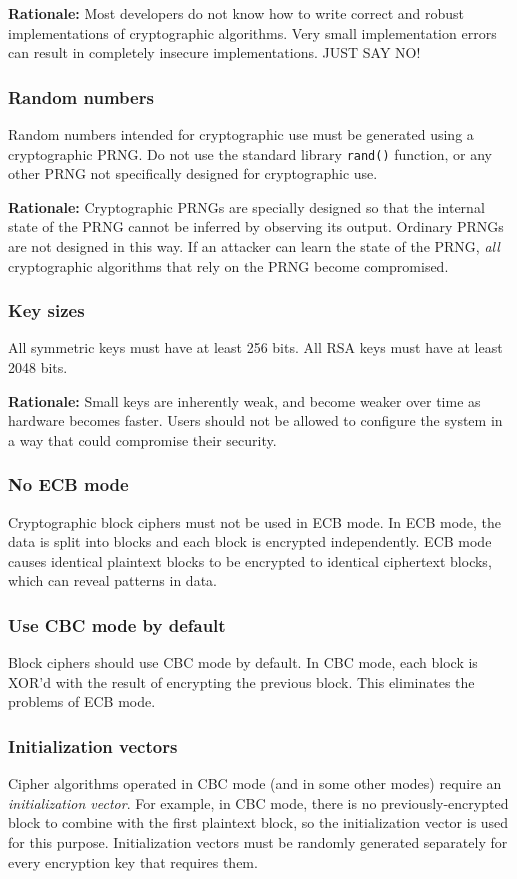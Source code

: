 \documentclass[]{article}
\begin{document}
\textbf{Rationale:} Most developers do not know how to write correct and robust implementations of cryptographic algorithms. Very small implementation errors can result in completely insecure implementations. JUST SAY NO!

\subsubsection{Random numbers}
Random numbers intended for cryptographic use must be generated using a cryptographic PRNG. Do not use the standard library \verb'rand()' function, or any other PRNG not specifically designed for cryptographic use.

\textbf{Rationale:} Cryptographic PRNGs are specially designed so that the internal state of the PRNG cannot be inferred by observing its output. Ordinary PRNGs are not designed in this way. If an attacker can learn the state of the PRNG, \emph{all} cryptographic algorithms that rely on the PRNG become compromised.

\subsubsection{Key sizes}
All symmetric keys must have at least 256 bits. All RSA keys must have at least 2048 bits.

\textbf{Rationale:} Small keys are inherently weak, and become weaker over time as hardware becomes faster. Users should not be allowed to configure the system in a way that could compromise their security.

\subsubsection{No ECB mode}
Cryptographic block ciphers must not be used in ECB mode. In ECB mode, the data is split into blocks and each block is encrypted independently. ECB mode causes identical plaintext blocks to be encrypted to identical ciphertext blocks, which can reveal patterns in data.

\subsubsection{Use CBC mode by default}
Block ciphers should use CBC mode by default. In CBC mode, each block is XOR'd with the result of encrypting the previous block. This eliminates the problems of ECB mode.

\subsubsection{Initialization vectors}
Cipher algorithms operated in CBC mode (and in some other modes) require an \emph{initialization vector}. For example, in CBC mode, there is no previously-encrypted block to combine with the first plaintext block, so the initialization vector is used for this purpose. Initialization vectors must be randomly generated separately for every encryption key that requires them.
\end{document}
